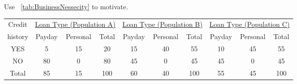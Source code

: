 Use ~\ref{tab:BusinessNessecity} to motivate.
\begin{table*}[t]
{ \small
  \center
  \renewcommand{\arraystretch}{1.5}
  \begin{tabular}{ c | c c c | c c c | c c c}
    Credit
    & \multicolumn{3}{|c|}{\underline{Loan Type (Population A)}}
    & \multicolumn{3}{|c}{\underline{Loan Type (Population B) }}
    & \multicolumn{3}{|c}{\underline{Loan Type (Population C) }} \\
    history & Payday & Personal & Total & Payday & Personal & Total & Payday & Personal & Total \\
    \hline
    YES & 5  & 15 & 20 & 15 & 40 & 55 & 10 & 45 & 55 \\
    NO  & 80 & 0  & 80 & 45 & 0 & 45 & 45 & 0 & 45\\
    \hline
    Total & 85 & 15 & 100 & 60 & 40 & 100 & 55 & 45 & 100\\
  \end{tabular}
  \label{tab:BusinessNessecity}
  \caption{{\bf Discriminatory behavior on presence of bussiness necessity (credit history).}
  At first sight users of population A are proportionaly taking more payday loans
  (payday loans come with higher interest than personal loans) than users of population B.
  Specifically, users of population A receive 25\% more and 20\% more  payday loans than
  users of populations B and C, respectively. However, upon closer examination, one notes
  that only 20\% of A's users have credit history (which is a prerequisite for personal
  loans) against 55\% of B's and C's users. Therefore, bussiness necessity requires that
  before examining statistical parity, users should be discriminated based on whether
  they have credit history or not.}
}
\end{table*}

